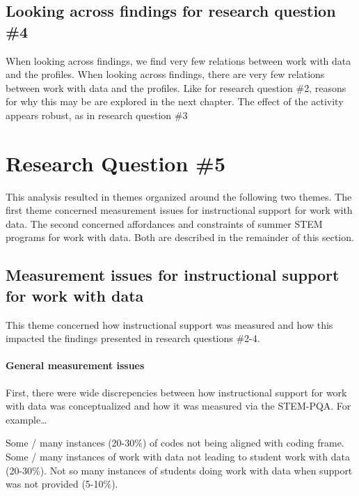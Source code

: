 \documentclass[]{book}
\let\oldparagraph\paragraph
\renewcommand{\paragraph}[1]{\oldparagraph{#1}\mbox{}}
\theoremstyle{definition}
\theoremstyle{definition}
\theoremstyle{definition}
\theoremstyle{remark}
\begin{document}
\subsection{Looking across findings for research question
\#4}\label{looking-across-findings-for-research-question-4}

When looking across findings, we find very few relations between work
with data and the profiles. When looking across findings, there are very
few relations between work with data and the profiles. Like for research
question \#2, reasons for why this may be are explored in the next
chapter. The effect of the activity appears robust, as in research
question \#3

\section{Research Question \#5}\label{research-question-5}

This analysis resulted in themes organized around the following two
themes. The first theme concerned measurement issues for instructional
support for work with data. The second concerned affordances and
constraints of summer STEM programs for work with data. Both are
described in the remainder of this section.

\subsection{Measurement issues for instructional support for work with
data}\label{measurement-issues-for-instructional-support-for-work-with-data}

This theme concerned how instructional support was measured and how this
impacted the findings presented in research questions \#2-4.

\paragraph{General measurement issues}\label{general-measurement-issues}

First, there were wide discrepencies between how instructional support
for work with data was conceptualized and how it was measured via the
STEM-PQA. For example\ldots{}

Some / many instances (20-30\%) of codes not being aligned with coding
frame. Some / many instances of work with data not leading to student
work with data (20-30\%). Not so many instances of students doing work
with data when support was not provided (5-10\%).
\end{document}

